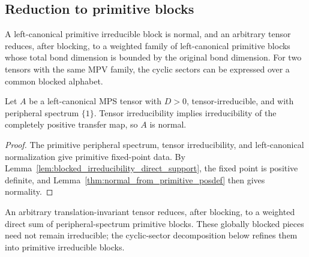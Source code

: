\subsection{Reduction to primitive blocks}%
\label{sec:reduction_to_normal_form}

A left-canonical primitive irreducible block is normal, and an arbitrary tensor
reduces, after blocking, to a weighted family of left-canonical primitive
blocks whose total bond dimension is bounded by the original bond dimension.
For two tensors with the same MPV family, the cyclic sectors can be expressed
over a common blocked alphabet.

\begin{lemma}%
    \label{thm:normal_tp_primitive_irred}
    \leanok
    Let $A$ be a left-canonical MPS tensor with $D>0$, tensor-irreducible, and
    with peripheral spectrum $\{1\}$. Tensor irreducibility implies
    irreducibility of the completely positive transfer map, so $A$ is normal.
\end{lemma}

\begin{proof}\leanok
    The primitive peripheral spectrum, tensor irreducibility, and
    left-canonical normalization give primitive fixed-point data. By
    Lemma~\ref{lem:blocked_irreducibility_direct_support}, the fixed
    point is positive definite, and
    Lemma~\ref{thm:normal_from_primitive_posdef} then gives normality.
\end{proof}

An arbitrary translation-invariant tensor reduces, after blocking, to a weighted
direct sum of peripheral-spectrum primitive blocks. These globally blocked
pieces need not remain irreducible; the cyclic-sector decomposition below
refines them into primitive irreducible blocks.

